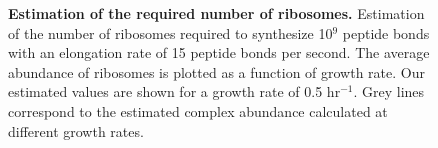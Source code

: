 
\begin{figure}
        \caption{\textbf{Estimation of the required number of ribosomes.} Estimation of the
        number of ribosomes required to synthesize 10$^9$ peptide bonds with an
        elongation rate of 15 peptide bonds per second. The
        average abundance of ribosomes is plotted as a function of growth rate.
        Our estimated values are shown for a growth rate of 0.5 hr$^{-1}$.
        Grey lines correspond to the estimated complex abundance calculated at
        different growth rates.} \label{fig:protein_synthesis}


\end{figure}

